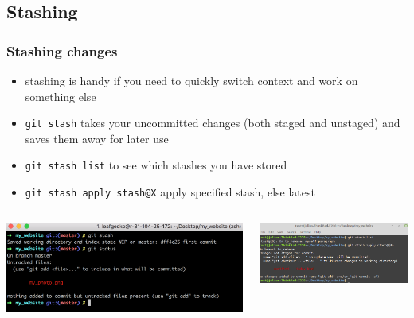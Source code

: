\documentclass[12pt]{beamer}
\begin{document}
\subsection{Stashing}
\begin{frame}
\frametitle{Stashing changes}
\begin{itemize}
	\item stashing is handy if you need to quickly switch context and work on something else
	\item \texttt{git stash} takes your uncommitted changes (both staged and unstaged) and saves them away for later use
	\item \texttt{git stash list} to see which stashes you have stored
	\item \texttt{git stash apply stash@{X}} apply specified stash, else latest
\end{itemize}
\begin{columns}
	\begin{column}{0.5\linewidth}
		\includegraphics[width=\linewidth]{stash}
	\end{column}
	\begin{column}{0.5\linewidth}
		\includegraphics[width=\linewidth]{after_stash}
	\end{column}
\end{columns}
\end{frame}
\end{document}
